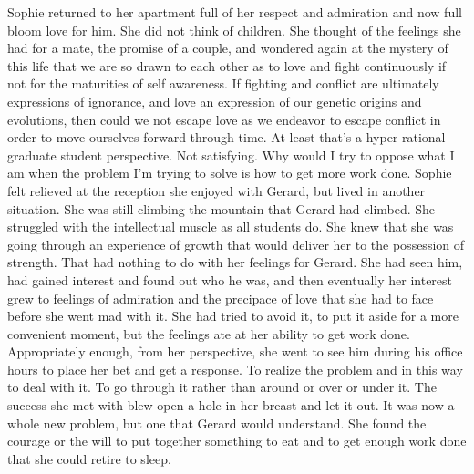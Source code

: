 Sophie returned to her apartment full of her respect and admiration
and now full bloom love for him.  She did not think of children.  She
thought of the feelings she had for a mate, the promise of a couple,
and wondered again at the mystery of this life that we are so drawn to
each other as to love and fight continuously if not for the maturities
of self awareness.  If fighting and conflict are ultimately
expressions of ignorance, and love an expression of our genetic
origins and evolutions, then could we not escape love as we endeavor
to escape conflict in order to move ourselves forward through time.
At least that's a hyper-rational graduate student perspective.  Not
satisfying.  Why would I try to oppose what I am when the problem I'm
trying to solve is how to get more work done.  Sophie felt relieved at
the reception she enjoyed with Gerard, but lived in another situation.
She was still climbing the mountain that Gerard had climbed.  She
struggled with the intellectual muscle as all students do.  She knew
that she was going through an experience of growth that would deliver
her to the possession of strength.  That had nothing to do with her
feelings for Gerard.  She had seen him, had gained interest and found
out who he was, and then eventually her interest grew to feelings of
admiration and the precipace of love that she had to face before she
went mad with it.  She had tried to avoid it, to put it aside for a
more convenient moment, but the feelings ate at her ability to get
work done.  Appropriately enough, from her perspective, she went to
see him during his office hours to place her bet and get a response.
To realize the problem and in this way to deal with it.  To go through
it rather than around or over or under it.  The success she met with
blew open a hole in her breast and let it out.  It was now a whole new
problem, but one that Gerard would understand.  She found the courage
or the will to put together something to eat and to get enough work
done that she could retire to sleep.



